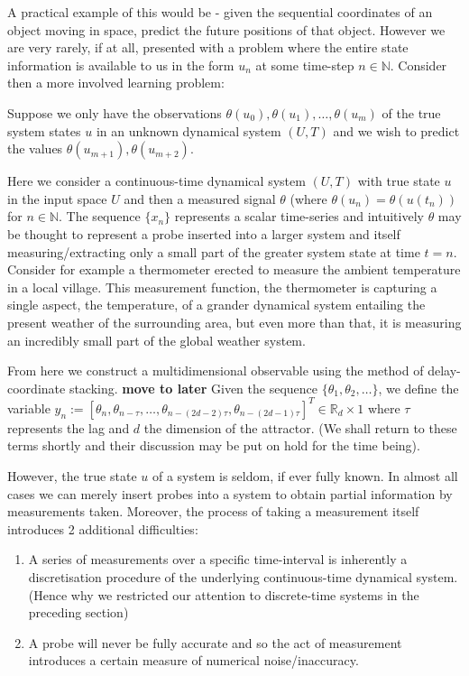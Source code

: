 \documentclass[12 pt]{article}
\begin{document}
A practical example of this would be - given the sequential coordinates of an object moving in space, predict the future positions of that object. However we are very rarely, if at all, presented with a problem where the entire state information is available to us in the form $u_n$ at some time-step $n\in\mathbb{N}$. Consider then a more involved learning problem:

Suppose we only have the observations $\theta(u_0), \theta(u_1), \ldots, \theta(u_m)$ of the true system states $u$ in an unknown dynamical system $(U,T)$ and we wish to predict the values $\theta(u_{m+1}), \theta(u_{m+2})$. 

Here we consider a continuous-time dynamical system $(U,T)$ with true state $u$ in the input space $U$ and then a measured signal $\theta$ (where $\theta(u_n)=\theta(u(t_n))$ for $n\in\mathbb{N}$. The sequence $\{x_n\}$ represents a scalar time-series and intuitively $\theta$ may be thought to represent a probe inserted into a larger system and itself measuring/extracting only a small part of the greater system state at time $t=n$. Consider for example a thermometer erected to measure the ambient temperature in a local village. This measurement function, the thermometer is capturing a single aspect, the temperature, of a grander dynamical system entailing the present weather of the surrounding area, but even more than that, it is measuring an incredibly small part of the global weather system. 

From here we construct a multidimensional observable using the method of delay-coordinate stacking. 
\textbf{move to later} Given the sequence $\{\theta_1, \theta_2, \ldots\}$, we define the variable \newline $y_n:=[\theta_n, \theta_{n-\tau}, \ldots, \theta_{n-(2d-2)\tau}, \theta_{n-(2d-1)\tau}]^{T}\in\mathbb{R}_{d}\times{1}$ where $\tau$ represents the lag and $d$ the dimension of the attractor. (We shall return to these terms shortly and their discussion may be put on hold for the time being).

However, the true state $u$ of a system is seldom, if ever fully known. In almost all cases we can merely insert probes into a system to obtain partial information by measurements taken. Moreover, the process of taking a measurement itself introduces 2 additional difficulties:
\vspace{-8mm}
\begin{enumerate}[noitemsep, label=\roman*.]
  \item A series of measurements over a specific time-interval is inherently a discretisation
  procedure of the underlying continuous-time dynamical system. (Hence why we restricted our attention to discrete-time systems in the preceding section)
  \item A probe will never be fully accurate and so the act of measurement introduces a certain
measure of numerical noise/inaccuracy.
\end{enumerate}
\end{document}
